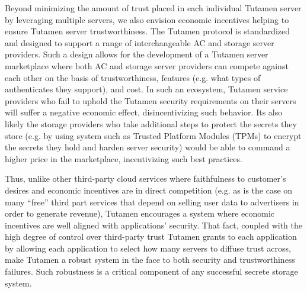 Beyond minimizing the amount of trust placed in each individual
Tutamen server by leveraging multiple servers, we also envision
economic incentives helping to ensure Tutamen server
trustworthiness. The Tutamen protocol is standardized and designed to
support a range of interchangeable AC and storage server
providers. Such a design allows for the development of a Tutamen
server marketplace where both AC and storage server providers can
compete against each other on the basis of trustworthiness, features
(e.g. what types of authenticates they support), and cost. In such an
ecosystem, Tutamen service providers who fail to uphold the Tutamen
security requirements on their servers will suffer a negative economic
effect, disincentivizing such behavior. Its also likely the storage
providers who take additional steps to protect the secrets they store
(e.g. by using system such as Trusted Platform Modules (TPMs) to
encrypt the secrets they hold and harden server security) would be
able to command a higher price in the marketplace, incentivizing such
best practices.

Thus, unlike other third-party cloud services where faithfulness to
customer's desires and economic incentives are in direct competition
(e.g. as is the case on many ``free'' third part services that depend
on selling user data to advertisers in order to generate revenue),
Tutamen encourages a system where economic incentives are well aligned
with applications' security. That fact, coupled with the high degree of
control over third-party trust Tutamen grants to each application by
allowing each application to select how many servers to diffuse trust
across, make Tutamen a robust system in the face to both security and
trustworthiness failures. Such robustness is a critical component of
any successful secrete storage system.


